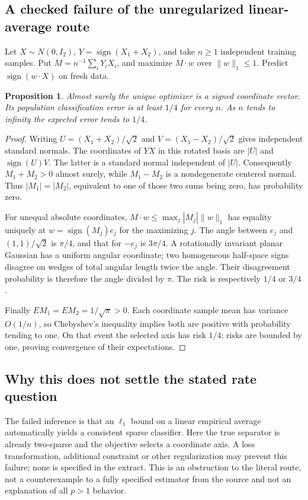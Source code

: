 \documentclass[11pt]{article}
\newtheorem{proposition}{Proposition}
\begin{document}
\subsection{A checked failure of the unregularized linear-average route}
Let $X\sim N(0,I_2)$, $Y=\operatorname{sign}(X_1+X_2)$, and take $n\ge1$ independent training samples. Put $M=n^{-1}\sum_iY_iX_i$, and maximize $M\cdot w$ over $\|w\|_1\le1$. Predict $\operatorname{sign}(w\cdot X)$ on fresh data.
\begin{proposition}
Almost surely the unique optimizer is a signed coordinate vector. Its population classification error is at least $1/4$ for every $n$. As $n$ tends to infinity the expected error tends to $1/4$.
\end{proposition}
\begin{proof}
Writing $U=(X_1+X_2)/\sqrt2$ and $V=(X_1-X_2)/\sqrt2$ gives independent standard normals. The coordinates of $YX$ in this rotated basis are $|U|$ and $\operatorname{sign}(U)V$. The latter is a standard normal independent of $|U|$. Consequently $M_1+M_2>0$ almost surely, while $M_1-M_2$ is a nondegenerate centered normal. Thus $|M_1|=|M_2|$, equivalent to one of those two sums being zero, has probability zero.

For unequal absolute coordinates, $M\cdot w\le\max_j|M_j|\|w\|_1$ has equality uniquely at $w=\operatorname{sign}(M_j)e_j$ for the maximizing $j$. The angle between $e_j$ and $(1,1)/\sqrt2$ is $\pi/4$, and that for $-e_j$ is $3\pi/4$. A rotationally invariant planar Gaussian has a uniform angular coordinate; two homogeneous half-space signs disagree on wedges of total angular length twice the angle. Their disagreement probability is therefore the angle divided by $\pi$. The risk is respectively $1/4$ or $3/4$.

Finally $EM_1=EM_2=1/\sqrt\pi>0$. Each coordinate sample mean has variance $O(1/n)$, so Chebyshev's inequality implies both are positive with probability tending to one. On that event the selected axis has risk $1/4$; risks are bounded by one, proving convergence of their expectations.
\end{proof}
\subsection{Why this does not settle the stated rate question}
The failed inference is that an $\ell_1$ bound on a linear empirical average automatically yields a consistent sparse classifier. Here the true separator is already two-sparse and the objective selects a coordinate axis. A loss transformation, additional constraint or other regularization may prevent this failure; none is specified in the extract. This is an obstruction to the literal route, not a counterexample to a fully specified estimator from the source and not an explanation of all $p>1$ behavior.
\end{document}
